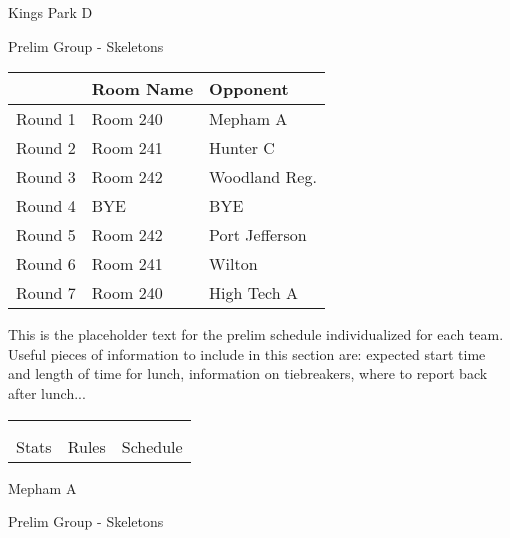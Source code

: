 \documentclass{article}%
\begin{document}
\newpage%
%
\begin{center}%
\begin{Huge}%
Kings Park D%
\end{Huge}%
\vspace*{12pt}%
\linebreak%
\begin{Large}%
Prelim Group {-} Skeletons%
\end{Large}%
\end{center}%
\vspace*{4pt}%
\begin{tabularx}{\textwidth}{|c|Y|Y|}%
\hline%
&Room Name&Opponent\\%
\hline%
Round 1&Room 240&Mepham A\\%
Round 2&Room 241&Hunter C\\%
Round 3&Room 242&Woodland Reg.\\%
Round 4&BYE&BYE\\%
Round 5&Room 242&Port Jefferson\\%
Round 6&Room 241&Wilton\\%
Round 7&Room 240&High Tech A\\%
\hline%
\end{tabularx}%
\vspace*{30pt}%
\linebreak%
This is the placeholder text for the prelim schedule individualized for each team. Useful pieces of information to include in this section are: expected start time and length of time for lunch, information on tiebreakers, where to report back after lunch...%
\vspace*{30pt}%
\newline%
%
\begin{tabularx}{\textwidth}{YYY}%
  &  &  \\%
\\%
Stats&Rules&Schedule\\%
\end{tabularx}%
\newpage%
%
\begin{center}%
\begin{Huge}%
Mepham A%
\end{Huge}%
\vspace*{12pt}%
\linebreak%
\begin{Large}%
Prelim Group {-} Skeletons%
\end{Large}%
\end{center}%
\end{document}
